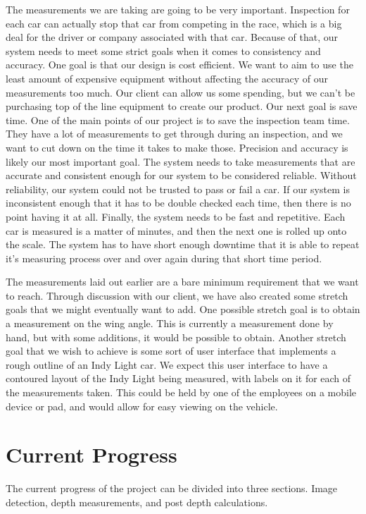 \documentclass[onecolumn, draftclsnofoot,10pt, compsoc]{IEEEtran}
\begin{document}
\noindent The measurements we are taking are going to be very important.  Inspection for each car can actually stop that car from competing in the race, which is a big deal for the driver or company associated with that car.  Because of that, our system needs to meet some strict goals when it comes to consistency and accuracy.  One goal is that our design is cost efficient.  We want to aim to use the least amount of expensive equipment without affecting the accuracy of our measurements too much.  Our client can allow us some spending, but we can’t be purchasing top of the line equipment to create our product.  Our next goal is save time.  One of the main points of our project is to save the inspection team time.  They have a lot of measurements to get through during an inspection, and we want to cut down on the time it takes to make those.  Precision and accuracy is likely our most important goal.  The system needs to take measurements that are accurate and consistent enough for our system to be considered reliable.  Without reliability, our system could not be trusted to pass or fail a car.  If our system is inconsistent enough that it has to be double checked each time, then there is no point having it at all.  Finally, the system needs to be fast and repetitive.  Each car is measured is a matter of minutes, and then the next one is rolled up onto the scale.  The system has to have short enough downtime that it is able to repeat it’s measuring process over and over again during that short time period.

\newline

\noindent The measurements laid out earlier are a bare minimum requirement that we want to reach.  Through discussion with our client, we have also created some stretch goals that we might eventually want to add.  One possible stretch goal is to obtain a measurement on the wing angle.  This is currently a measurement done by hand, but with some additions, it would be possible to obtain.  Another stretch goal that we wish to achieve is some sort of user interface that implements a rough outline of an Indy Light car.  We expect this user interface to have a contoured layout of the Indy Light being measured, with labels on it for each of the measurements taken.  This could be held by one of the employees on a mobile device or pad, and would allow for easy viewing on the vehicle.

\section{Current Progress}
The current progress of the project can be divided into three sections.  Image detection, depth measurements, and post depth calculations.
\end{document}
